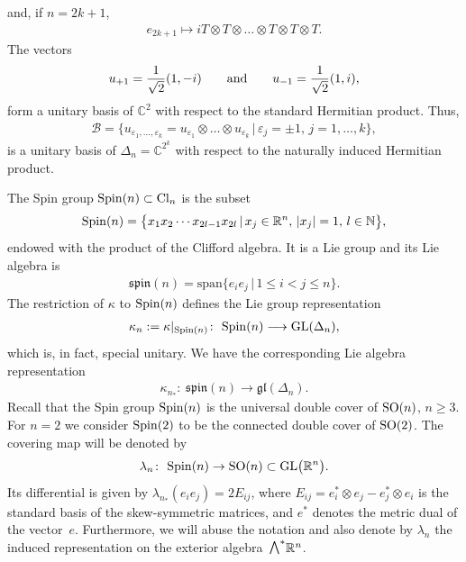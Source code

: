 \documentclass[pdftex]{sigma}
\newcommand{\ext}{\raise1pt\hbox{$\textstyle\bigwedge$}}
\numberwithin{equation}{section}
\begin{document}
and, if $n=2k+1$,
\begin{gather*} e_{2k+1}\mapsto i T\otimes T\otimes\dots\otimes T\otimes T\otimes T.\end{gather*}
The vectors
\begin{gather*}u_{+1}={1\over \sqrt{2}}(1,-i)\qquad\text{and}\qquad u_{-1}={1\over \sqrt{2}}(1,i),\end{gather*}
form a unitary basis of $\mathbb{C}^2$ with respect to the standard Hermitian product. Thus,{\samepage
\begin{gather*}\mathcal{B}=\{u_{\varepsilon_1,\dots,\varepsilon_k}=u_{\varepsilon_1}\otimes\dots\otimes
u_{\varepsilon_k}\,|\, \varepsilon_j=\pm 1,\, j=1,\dots,k\},\end{gather*}
is a unitary basis of $\Delta_n=\mathbb{C}^{2^k}$ with respect to the naturally induced Hermitian product.}

The Spin group ${\rm Spin}(n)\subset {\rm Cl}_n$ is the subset
\begin{gather*}{\rm Spin}(n) =\big\{x_1x_2\cdots x_{2l-1}x_{2l}\,|\,x_j\in\mathbb{R}^n, \,
|x_j|=1,\, l\in\mathbb{N}\big\},\end{gather*}
endowed with the product of the Clif\/ford algebra. It is a Lie group and its Lie algebra is
\begin{gather*}\mathfrak{spin}(n)=\mbox{span}\{e_ie_j\,|\,1\leq i< j \leq n\}.\end{gather*}
The restriction of $\kappa$ to ${\rm Spin}(n)$ def\/ines the Lie group representation
\begin{gather*}\kappa_n:=\kappa|_{{\rm Spin}(n)}\colon \ {\rm Spin}(n)\longrightarrow {\rm GL}(\Delta_n),\end{gather*}
which is, in fact, special unitary. We have the corresponding Lie algebra representation
\begin{gather*}\kappa_{n_*}\colon \ \mathfrak{spin}(n)\longrightarrow \mathfrak{gl}(\Delta_n).\end{gather*}
Recall that the Spin group ${\rm Spin}(n)$ is the universal double cover of ${\rm SO}(n)$, $n\ge 3$. For $n=2$ we consider ${\rm Spin}(2)$ to be the connected double cover of ${\rm SO}(2)$. The covering map will be denoted by
\begin{gather*}\lambda_n\colon \ {\rm Spin}(n)\rightarrow {\rm SO}(n)\subset {\rm GL}\big(\mathbb{R}^n\big).\end{gather*}
Its dif\/ferential is given by $\lambda_{n_*}(e_ie_j) = 2E_{ij}$, where $E_{ij}=e_i^*\otimes e_j - e_j^*\otimes e_i$ is the standard basis of the skew-symmetric matrices, and $e^*$ denotes the metric dual of the vector~$e$. Furthermore, we will abuse the notation and also denote by $\lambda_n$ the induced representation on the exterior algebra~$\ext^*\mathbb{R}^n$.
\end{document}
